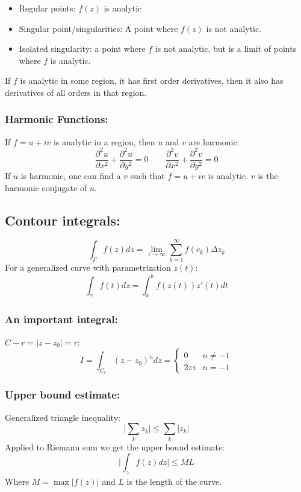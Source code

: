 \documentclass[a4paper,norsk, 10pt]{article}
\begin{document}
\begin{itemize}
\item Regular points: $f(z)$ is analytic
\item Singular point/singularities: A point where $f(z)$ is not analytic.
\item Isolated singularity: a point where $f$ is not analytic, but is a limit of points where $f$ is analytic.
\end{itemize}

If $f$ is analytic in some region, it has first order derivatives, then it also has derivatives of all orders in that region.

\subsubsection{Harmonic Functions:}
If $f = u + iv$ is analytic in a region, then $u$ and $v$ are harmonic:
\begin{equation}
\frac{\partial^2 u}{\partial x^2} + \frac{\partial^2 u}{\partial y^2} = 0\qquad \frac{\partial^2 v}{\partial x^2} + \frac{\partial^2 v}{\partial y^2} = 0
\end{equation}
If $u$ is harmonic, one can find a $v$ such that $f = u + iv$ is analytic. $v$ is the harmonic conjugate of $u$.

\subsection{Contour integrals:}
\begin{equation}
\int_{\Gamma} f(z) dz = \lim_{z\rightarrow \infty} \sum_{k=1}^{\infty} f(c_k) \Delta z_k
\end{equation}
For a generalized curve with parametrization $z(t)$:
\begin{equation}
\int_{\gamma}f(t)dz = \int_a^b f(z(t))z'(t)dt
\end{equation}
\subsubsection{An important integral:}
$C-r = |z-z_0| = r$:
\begin{equation}
I = \int_{C_r}(z-z_0)^n dz = 
\begin{cases}
0 & n \neq -1\\
2\pi i & n = -1
\end{cases}
\end{equation}
\subsubsection{Upper bound estimate:}
Generalized triangle inequality:
\begin{equation}
\bigg| \sum_k z_k\bigg| \leq \sum_k|z_k|
\end{equation}
Applied to Riemann sum we get the upper bound estimate:
\begin{equation}
\bigg| \int_{\gamma}f(z) dz\bigg| \leq ML
\end{equation}
Where $M = \max|f(z)|$ and $L$ is the length of the curve.
\end{document}
